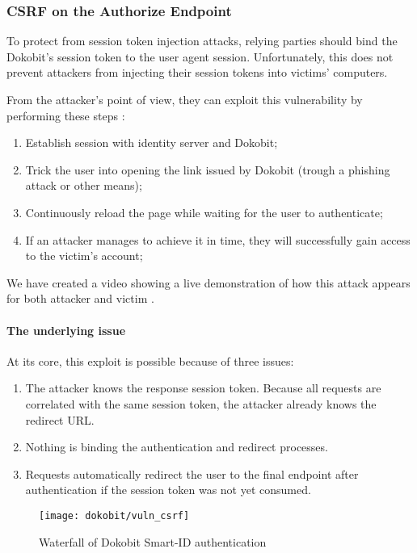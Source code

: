 \subsubsection{CSRF on the Authorize Endpoint}

To protect from session token injection attacks, relying parties should bind the Dokobit's session token to the user agent session. Unfortunately, this does not prevent attackers from injecting their session tokens into victims' computers.

From the attacker's point of view, they can exploit this vulnerability by performing these steps \cite{video-exploitdokobit}:

\begin{enumerate}
  \item Establish session with identity server and Dokobit;
  \item Trick the user into opening the link issued by Dokobit (trough a phishing attack or other means);
  \item Continuously reload the page while waiting for the user to authenticate;
  \item If an attacker manages to achieve it in time, they will successfully gain access to the victim's account;
\end{enumerate}

We have created a video showing a live demonstration of how this attack appears for both attacker and victim \cite{video-exploitdokobit}.

\paragraph{The underlying issue}

At its core, this exploit is possible because of three issues:

\begin{enumerate}
  \item The attacker knows the response session token. Because all requests are correlated with the same session token, the attacker already knows the redirect URL.
  \item Nothing is binding the authentication and redirect processes.
  \item Requests automatically redirect the user to the final endpoint after authentication if the session token was not yet consumed.
\end{enumerate}

\begin{figure}
  \centering
  \texttt{[image: dokobit/vuln\_csrf]}
  \caption{Waterfall of Dokobit Smart-ID authentication}
  \label{fig:dokobit-vuln-csrf}
\end{figure}


